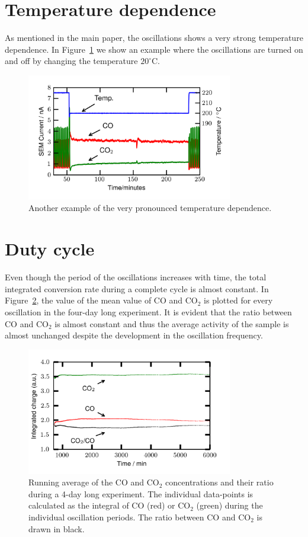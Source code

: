 \documentclass[8.5pt,twoside,twocolumn]{article}
\begin{document}
\section{Temperature dependence}
As mentioned in the main paper, the oscillations shows a very strong temperature dependence. In Figure~\ref{fgr:temperature_dependence_supplemental} we show an example where the oscillations are turned on and off by changing the temperature $20^\circ$C.

\begin{figure}[h]
\centering
  \includegraphics[width=9cm]{temperature_dependence_supplemental.png}
  \caption{Another example of the very pronounced temperature dependence.}
  \label{fgr:temperature_dependence_supplemental}
\end{figure}

\section{Duty cycle}
Even though the period of the oscillations increases with time, the total integrated conversion rate during a complete cycle is almost constant. In Figure~\ref{fgr:duty_cycles_supplemental}, the value of the mean value of CO and CO$_2$ is plotted for every oscillation in the four-day long experiment. It is evident that the ratio between CO and CO$_2$ is almost constant and thus the average activity of the sample is almost unchanged despite the development in the oscillation frequency.


\begin{figure}[h]
\centering
  \includegraphics[width=9cm]{duty_cycles_long_measurement_supplemental.png}
  \caption{Running average of the CO and CO$_2$ concentrations and their ratio during a 4-day long experiment. The individual data-points is calculated as the integral of CO (red) or CO$_2$ (green) during the individual oscillation periods. The ratio between CO and CO$_2$ is drawn in black.}
  \label{fgr:duty_cycles_supplemental}
\end{figure}



\footnotesize{
}
\end{document}
